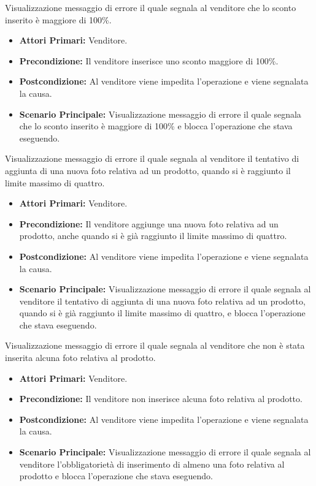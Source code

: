 Visualizzazione messaggio di errore il quale segnala al venditore che lo sconto inserito è maggiore di 100\%.
\begin{itemize}
    \item \textbf{Attori Primari:} Venditore.
    \item \textbf{Precondizione:} Il venditore inserisce uno sconto maggiore di 100\%.
    \item \textbf{Postcondizione:} Al venditore viene impedita l'operazione e viene segnalata la causa.
    \item \textbf{Scenario Principale:} Visualizzazione messaggio di errore il quale segnala che lo sconto inserito è maggiore di 100\% e blocca l'operazione che stava eseguendo.
\end{itemize}

Visualizzazione messaggio di errore il quale segnala al venditore il tentativo di aggiunta di una nuova foto relativa ad un prodotto, quando si è raggiunto il limite massimo di quattro.
\begin{itemize}
    \item \textbf{Attori Primari:} Venditore.
    \item \textbf{Precondizione:} Il venditore aggiunge una nuova foto relativa ad un prodotto, anche quando si è già raggiunto il limite massimo di quattro.
    \item \textbf{Postcondizione:} Al venditore viene impedita l'operazione e viene segnalata la causa.
    \item \textbf{Scenario Principale:} Visualizzazione messaggio di errore il quale segnala al venditore il tentativo di aggiunta di una nuova foto relativa ad un prodotto, quando si è già raggiunto il limite massimo di quattro, e blocca l'operazione che stava eseguendo.
\end{itemize}

Visualizzazione messaggio di errore il quale segnala al venditore che non è stata inserita alcuna foto relativa al prodotto.
\begin{itemize}
    \item \textbf{Attori Primari:} Venditore.
    \item \textbf{Precondizione:} Il venditore non inserisce alcuna foto relativa al prodotto.
    \item \textbf{Postcondizione:} Al venditore viene impedita l'operazione e viene segnalata la causa.
    \item \textbf{Scenario Principale:} Visualizzazione messaggio di errore il quale segnala al venditore l'obbligatorietà di inserimento di almeno una foto relativa al prodotto e blocca l'operazione che stava eseguendo.
\end{itemize}

